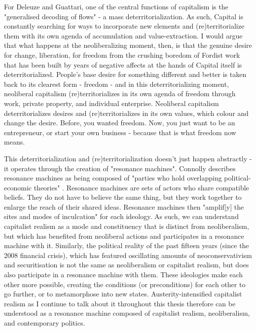 For Deleuze and Guattari, one of the central functions of capitalism is the "generalised decoding of flows" \citep[153]{deleuze_anti-oedipus:_1983} - a mass deterritorialization. As such, Capital is constantly searching for ways to incorporate new elements and (re)territorialize them with its own agenda of accumulation and value-extraction. I would argue that what happens at the neoliberalizing moment, then, is that the genuine desire for change, liberation, for freedom from the crushing boredom of Fordist work that has been built by years of negative affects at the hands of Capital itself is deterritorialized. People's base desire for something different and better is taken back to its clearest form - freedom - and in this deterritorializing moment, neoliberal capitalism (re)territorializes in its own agenda of freedom through work, private property, and individual enterprise. Neoliberal capitalism deterritorializes desires and (re)territorializes in its own values, which colour and change the desire. Before, you wanted freedom. Now, you just want to be an entrepreneur, or start your own business - because that is what freedom now means.

This deterritorialization and (re)territorialization doesn't just happen abstractly - it operates through the creation of "resonance machines". Connolly describes resonance machines as being composed of "parties who hold overlapping political-economic theories" \citep[68]{connolly_fragility_2013}. Resonance machines are sets of actors who share compatible beliefs. They do not have to believe the same thing, but they work together to enlarge the reach of their shared ideas. Resonance machines then "amplif[y] the sites and modes of inculcation" for each ideology. As such, we can understand capitalist realism as a mode and constituency that is distinct from neoliberalism, but which has benefited from neoliberal actions and participates in a resonance machine with it. Similarly, the political reality of the past  fifteen years (since the 2008 financial crisis), which has featured oscillating amounts of neoconservativism and securitisation is not the same as neoliberalism or capitalist realism, but does also participate in a resonance machine with them. These ideologies make each other more possible, creating the conditions (or preconditions) for each other to go further, or to metamorphose into new states. Austerity-intensified capitalist realism as I continue to talk about it throughout this thesis therefore can be understood as a resonance machine composed of capitalist realism, neoliberalism, and contemporary politics. 

